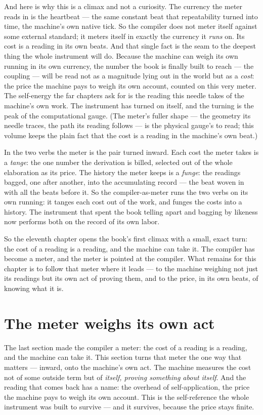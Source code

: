 And here is why this is a climax and not a curiosity. The currency the meter reads in is the heartbeat --- the same
constant beat that repeatability turned into time, the machine's own native tick. So the compiler does not meter itself
against some external standard; it meters itself in exactly the currency it \emph{runs} on. Its cost is a reading in
its own beats. And that single fact is the seam to the deepest thing the whole instrument will do. Because the machine
can weigh its own running in its own currency, the number the book is finally built to reach --- the coupling --- will
be read not as a magnitude lying out in the world but as a \emph{cost}: the price the machine pays to weigh its own
account, counted on this very meter. The self-energy the far chapters ask for is the reading this needle takes of the
machine's own work. The instrument has turned on itself, and the turning is the peak of the computational gauge. (The
meter's fuller shape --- the geometry its needle traces, the path its reading follows --- is the physical gauge's to
read; this volume keeps the plain fact that the cost is a reading in the machine's own beat.)

In the two verbs the meter is the pair turned inward. Each cost the meter takes is a \emph{tange}: the one number the
derivation is billed, selected out of the whole elaboration as its price. The history the meter keeps is a \emph{funge}:
the readings bagged, one after another, into the accumulating record --- the beat woven in with all the beats before
it. So the compiler-as-meter runs the two verbs on its own running: it tanges each cost out of the work, and funges the
costs into a history. The instrument that spent the book telling apart and bagging by likeness now performs both on the
record of its own labor.

So the eleventh chapter opens the book's first climax with a small, exact turn: the cost of a reading is a reading, and
the machine can take it. The compiler has become a meter, and the meter is pointed at the compiler. What remains for
this chapter is to follow that meter where it leads --- to the machine weighing not just its readings but its own act
of proving them, and to the price, in its own beats, of knowing what it is.

\section{The meter weighs its own act}

The last section made the compiler a meter: the cost of a reading is a reading, and the machine can take it. This
section turns that meter the one way that matters --- inward, onto the machine's own act. The machine measures the cost
not of some outside term but of \emph{itself, proving something about itself}. And the reading that comes back has a
name: the overhead of self-application, the price the machine pays to weigh its own account. This is the self-reference
the whole instrument was built to survive --- and it survives, because the price stays finite.

